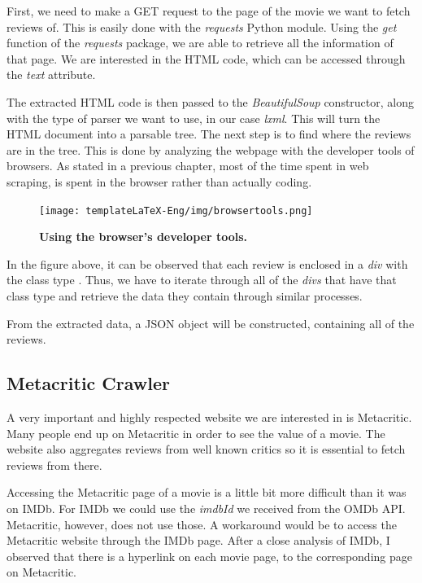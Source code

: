 \documentclass[12pt,a4paper,twoside]{report}
\begin{document}
First, we need to make a GET request to the page of the movie we want to fetch reviews of. This is easily done with the \textit{requests} Python module. Using the \textit{get} function of the \textit{requests} package, we are able to retrieve all the information of that page. We are interested in the HTML code, which can be accessed through the \textit{text} attribute.

The extracted HTML code is then passed to the \textit{BeautifulSoup} constructor, along with the type of parser we want to use, in our case \textit{lxml}. This will turn the HTML document into a parsable tree. The next step is to find where the reviews are in the tree. This is done by analyzing the webpage with the developer tools of browsers. As stated in a previous chapter, most of the time spent in web scraping, is spent in the browser rather than actually coding. 

 \begin{figure}[H]
    \begin{center}
        \texttt{[image: templateLaTeX-Eng/img/browsertools.png]}
        \caption{\bf Using the browser's developer tools.}
    \end{center}
\end{figure}

In the figure above, it can be observed that each review is enclosed in a \textit{div} with the class type . Thus, we have to iterate through all of the \textit{divs} that have that class type and retrieve the data they contain through similar processes.

From the extracted data, a JSON object will be constructed, containing all of the reviews.

\subsection{Metacritic Crawler}
A very important and highly respected website we are interested in is Metacritic. Many people end up on Metacritic in order to see the value of a movie. The website also aggregates reviews from well known critics so it is essential to fetch reviews from there.

Accessing the Metacritic page of a movie is a little bit more difficult than it was on IMDb. For IMDb we could use the \textit{imdbId} we received from the OMDb API. Metacritic, however, does not use those. A workaround would be to access the Metacritic website through the IMDb page. After a close analysis of IMDb, I observed that there is a hyperlink on each movie page, to the corresponding page on Metacritic.
\end{document}
